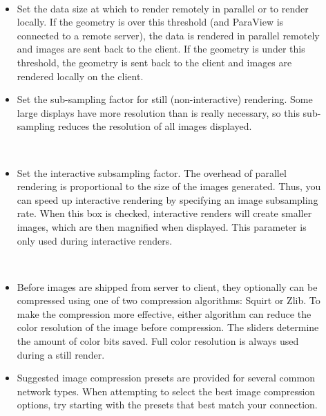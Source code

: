 \begin{description}
\item[]~
  \begin{itemize}
  \item {} Set the data size at which to
    render remotely in parallel or to render locally. If the geometry is
    over this threshold (and ParaView is connected to a remote server), the
    data is rendered in parallel remotely and images are sent back to the
    client. If the geometry is under this threshold, the geometry is sent
    back to the client and images are rendered locally on the client.
  \item Set the sub-sampling factor for still (non-interactive) rendering.
    Some large displays have more resolution than is really necessary, so
    this sub-sampling reduces the resolution of all images displayed.
  \end{itemize}
\item[]~
  \begin{itemize}
  \item {}  Set the
    interactive subsampling factor. The overhead of parallel rendering is
    proportional to the size of the images generated.  Thus, you can speed
    up interactive rendering by specifying an image subsampling rate.  When
    this box is checked, interactive renders will create smaller images,
    which are then magnified when displayed.  This parameter is only used
    during interactive renders. 
  \end{itemize}
\item[]~
  \begin{itemize}
  \item Before images are shipped from server to client, they optionally
    can be compressed using one of two compression algorithms:
    Squirt or Zlib. To make the compression more
    effective, either algorithm can reduce the color resolution of the
    image before compression.  The sliders determine the amount of color
    bits saved. Full color resolution is always used during a still
    render. 
  \item Suggested image compression presets are provided for several common
    network types. When attempting to select the best image compression
    options, try starting with the presets that best match your connection.
  \end{itemize}
\end{description}

